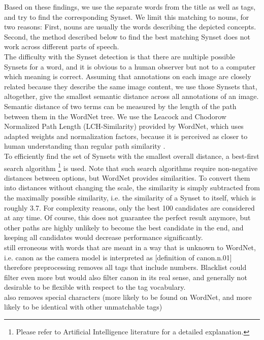 Based on these findings, we use the separate words from the title as well as tags, and try to find the corresponding Synset. We limit this matching to nouns, for two reasons: First, nouns are usually the words describing the depicted concepts. Second, the method described below to find the best matching Synset does not work across different parts of speech. \\

The difficulty with the Synset detection is that there are multiple possible Synsets for a word, and it is obvious to a human observer but not to a computer which meaning is correct. Assuming that annotations on each image are closely related because they describe the same image content, we use those Synsets that, altogether, give the smallest semantic distance across all annotations of an image. Semantic distance of two terms can be measured by the length of the path between them in the WordNet tree. We use the Leacock and Chodorow Normalized Path Length (LCH-Similarity) provided by WordNet, which uses adapted weights and normalization factors, because it is perceived as closer to human understanding than regular path similarity \cite{budanitsky01}.\\

To efficiently find the set of Synsets with the smallest overall distance, a best-first search algorithm \footnote{Please refer to Artificial Intelligence literature for a detailed explanation.} is used. Note that such search algorithms require non-negative distances between options, but WordNet provides similarities. To convert them into distances without changing the scale, the similarity is simply subtracted from the maximally possible similarity, i.e. the similarity of a Synset to itself, which is roughly 3.7.
For complexity reasons, only the best 100 candidates are considered at any time. Of course, this does not guarantee the perfect result anymore, but other paths are highly unlikely to become the best candidate in the end, and keeping all candidates would decrease performance significantly. \\
still erroneous with words that are meant in a way that is unknown to WordNet, i.e. canon as the camera model is interpreted as [definition of canon.n.01]  \\
therefore preprocessing removes all tags that include numbers. Blacklist could filter even more but would also filter canon in its real sense, and generally not desirable to be flexible with respect to the tag vocabulary.  \\
also removes special characters (more likely to be found on WordNet, and more likely to be identical with other unmatchable tags) 


